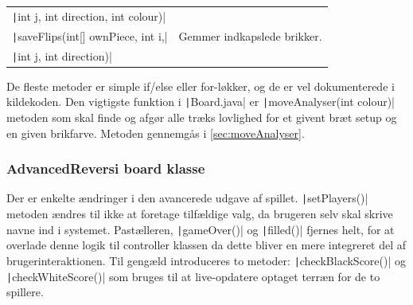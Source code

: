 \begin{table}[H]
\begin{tabular}{ll}
        \quad \texttt|int j, int direction, int colour)|    &                                                                       \\
        \texttt|saveFlips(int[] ownPiece, int i,|           & Gemmer indkapslede brikker.                                           \\
        \quad \texttt|int j, int direction)|                &                                                                       \\
        \bottomrule
    \end{tabular}
\end{table}
De fleste metoder er simple if/else eller for-løkker, og de er vel dokumenterede i kildekoden.\newline
Den vigtigste funktion i \texttt|Board.java| er \texttt|moveAnalyser(int colour)| metoden som skal finde og afgør alle træks lovlighed for et givent bræt setup og en given brikfarve. Metoden gennemgås i \cref{sec:moveAnalyser}.
\subsubsection{AdvancedReversi board klasse}
Der er enkelte ændringer i den avancerede udgave af spillet. \texttt|setPlayers()| metoden ændres til ikke at foretage tilfældige valg, da brugeren selv skal skrive navne ind i systemet. Pastælleren, \texttt|gameOver()| og \texttt|filled()| fjernes helt, for at overlade denne logik til controller klassen da dette bliver en mere integreret del af brugerinteraktionen. Til gengæld introduceres to metoder: \texttt|checkBlackScore()| og \texttt|checkWhiteScore()| som bruges til at live-opdatere optaget terræn for de to spillere.
